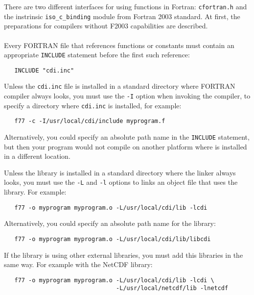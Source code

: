 There are two different interfaces for using {\CDI} functions in Fortran:
\texttt{cfortran.h} and the instrinsic \texttt{iso\_c\_binding} module from Fortran
2003 standard. At  first, the preparations for compilers without F2003
capabilities are described.\\\\
Every FORTRAN file that references {\CDI} functions or constants must contain
an appropriate \texttt{INCLUDE} statement before the first such reference:

\begin{verbatim}
   INCLUDE "cdi.inc"
\end{verbatim}

Unless the \texttt{cdi.inc} file is installed in a standard directory where
FORTRAN compiler always looks, you must use the \texttt{-I} option when invoking
the compiler, to specify a directory where \texttt{cdi.inc} is installed, for example:

\begin{verbatim}
   f77 -c -I/usr/local/cdi/include myprogram.f
\end{verbatim}

Alternatively, you could specify an absolute path name in the \texttt{INCLUDE}
statement, but then your program would not compile on another platform
where {\CDI} is installed in a different location.

Unless the {\CDI} library is installed in a standard directory where the linker
always looks, you must use the \texttt{-L} and \texttt{-l} options to links an object file that
uses the {\CDI} library. For example:

\begin{verbatim}
   f77 -o myprogram myprogram.o -L/usr/local/cdi/lib -lcdi
\end{verbatim}

Alternatively, you could specify an absolute path name for the library:

\begin{verbatim}
   f77 -o myprogram myprogram.o -L/usr/local/cdi/lib/libcdi
\end{verbatim}

If the {\CDI} library is using other external libraries, you must add this
libraries in the same way.
For example with the NetCDF library:

\begin{verbatim}
   f77 -o myprogram myprogram.o -L/usr/local/cdi/lib -lcdi \
                                -L/usr/local/netcdf/lib -lnetcdf
\end{verbatim}

